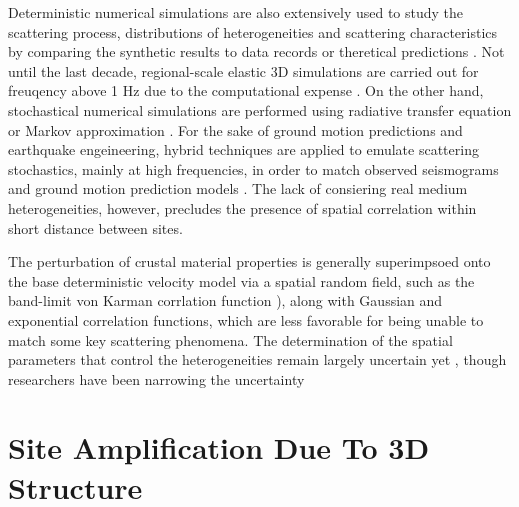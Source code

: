 Deterministic numerical simulations are also extensively used to study the scattering process, distributions of heterogeneities and scattering characteristics by comparing the synthetic results to data records or theretical predictions \citep{frankelFiniteDifferenceSimulations1986,rothSingleScatteringTheory1993,shapiroSeismicAttenuationScattering1993,thyboSeismicScatteringTop2003}. Not until the last decade, regional-scale elastic 3D simulations are carried out for freuqency above 1 Hz due to the computational expense \citep{hartzellEffects3DRandom2010,pitarka2009simulating}. On the other hand, stochastical numerical simulations are performed using radiative transfer equation \citep{gusevSimulatedEnvelopesNonisotropically1996,przybillaRadiativeTransferElastic2006} or Markov approximation \citep{saitoEnvelopeBroadeningSpherically2002,sawazakiEnvelopeSynthesisShortperiod2011}. For the sake of ground motion predictions and earthquake engeineering, hybrid techniques are applied to emulate scattering stochastics, mainly at high frequencies, in order to match observed seismograms and ground motion prediction models \citep{liuPredictionBroadbandGroundMotion2006,gravesBroadbandGroundMotionSimulation2010, maiHybridBroadbandGroundMotion2010}. The lack of consiering real medium heterogeneities, however, precludes the presence of spatial correlation within short distance between sites.

The perturbation of crustal material properties is generally superimpsoed onto the base deterministic velocity model via a spatial random field, such as the band-limit von Karman corrlation function \citep[][\cref{app:A}]{frankelFiniteDifferenceSimulations1986,hartzellEffects3DRandom2010}), along with Gaussian and exponential correlation functions, which are less favorable for being unable to match some key scattering phenomena. The determination of the spatial parameters that control the heterogeneities remain largely uncertain yet , though researchers have been narrowing the uncertainty \citep{thyboSeismicScatteringTop2003,nielsenIdentificationCrustalUpper2006, przybillaEstimationCrustalScattering2009, imperatoriBroadbandNearfieldGround2013, imperatoriRoleTopographyLateral2015}


\section{Site Amplification Due To 3D Structure}

